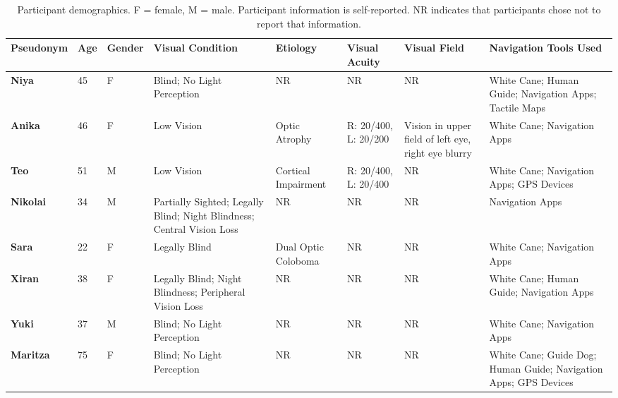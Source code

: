 \begin{table}[h!]
    \footnotesize 
    \centering
    \caption{\label{tab: Participants} Participant demographics. F = female, M = male. Participant information is self-reported. NR indicates that participants chose not to report that information.} 
    \begin{tabular}{p{1.4cm}p{0.3cm}p{1.0cm}p{2.0cm}p{1.5cm}p{2.0cm}p{2.0cm}p{4.0cm}}
    \toprule
      \textbf{Pseudonym}&  \textbf{Age}&  \textbf{Gender}&  \textbf{Visual Condition}&  \textbf{Etiology}&  \textbf{Visual Acuity}&   \textbf{Visual Field}&  \textbf{Navigation Tools Used} \\
     \midrule 
    
   \textbf{Niya}&   45&   F&  Blind; No Light Perception&  NR&    NR&     NR&  White Cane; Human Guide; Navigation Apps; Tactile Maps\\ 
    \midrule
    
    \textbf{Anika}&   46& F&  Low Vision&   Optic Atrophy&    R: 20/400, L: 20/200&     Vision in upper field of left eye, right eye blurry&  White Cane; Navigation Apps\\ 
    \midrule

     \textbf{Teo} & 51 & M&  Low Vision&   Cortical Impairment&    R: 20/400, L: 20/400&     NR&  White Cane; Navigation Apps; GPS Devices\\ 
    \midrule
    
      \textbf{Nikolai}&    34&    M& Partially Sighted; Legally Blind; Night Blindness; Central Vision Loss&   NR&    NR&     NR&  Navigation Apps\\ 
    \midrule
    
      \textbf{Sara}&    22& F&    Legally Blind&     Dual Optic Coloboma&    NR&     NR&  White Cane; Navigation Apps\\ 
    \midrule

      \textbf{Xiran}&    38& F&    Legally Blind; Night Blindness; Peripheral Vision Loss &    NR&    NR&     NR&  White Cane; Human Guide; Navigation Apps\\ 
    \midrule
    
      \textbf{Yuki}&    37& M&    Blind; No Light Perception&     NR&    NR&     NR&  White Cane; Navigation Apps\\ 
    \midrule
    
      \textbf{Maritza}&    75& F&   Blind; No Light Perception&     NR&    NR&     NR&  White Cane; Guide Dog; Human Guide; Navigation Apps; GPS Devices\\ 
    \midrule
    

\end{tabular}
\end{table}
